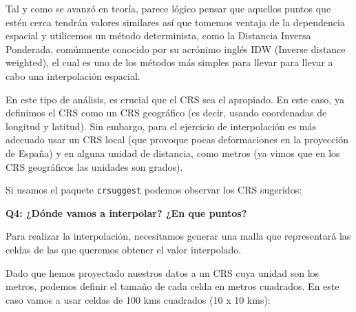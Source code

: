 \documentclass[
]{report}
\newenvironment{Shaded}{\begin{snugshade}}{\end{snugshade}}
\newcommand{\AttributeTok}[1]{\textcolor[rgb]{0.77,0.63,0.00}{#1}}
\newcommand{\CommentTok}[1]{\textcolor[rgb]{0.56,0.35,0.01}{\textit{#1}}}
\newcommand{\DecValTok}[1]{\textcolor[rgb]{0.00,0.00,0.81}{#1}}
\newcommand{\FunctionTok}[1]{\textcolor[rgb]{0.00,0.00,0.00}{#1}}
\newcommand{\NormalTok}[1]{#1}
\newcommand{\OtherTok}[1]{\textcolor[rgb]{0.56,0.35,0.01}{#1}}
\newcommand{\SpecialCharTok}[1]{\textcolor[rgb]{0.00,0.00,0.00}{#1}}
\newcommand{\StringTok}[1]{\textcolor[rgb]{0.31,0.60,0.02}{#1}}
\theoremstyle{definition}
\theoremstyle{definition}
\theoremstyle{definition}
\theoremstyle{definition}
\theoremstyle{remark}
\begin{document}
Tal y como se avanzó en teoría, parece lógico pensar que aquellos puntos que
estén cerca tendrán valores similares así que tomemos ventaja de la dependencia
espacial y utilicemos un método determinista, como la Distancia Inversa
Ponderada, comúnmente conocido por su acrónimo inglés IDW (Inverse distance
weighted), el cual es uno de los métodos más simples para llevar para llevar a
cabo una interpolación espacial.

En este tipo de análisis, es crucial que el CRS sea el apropiado. En este caso,
ya definimos el CRS como un CRS geográfico (es decir, usando coordenadas de
longitud y latitud). Sin embargo, para el ejercicio de interpolación es más
adecuado usar un CRS local (que provoque pocas deformaciones en la proyección de
España) y en alguna unidad de distancia, como metros (ya vimos que en los CRS
geográficos las unidades son grados).

Si usamos el paquete \texttt{crsuggest} podemos observar los CRS sugeridos:

\begin{Shaded}
\end{Shaded}

\textbf{Q4: ¿Dónde vamos a interpolar? ¿En que puntos?}

Para realizar la interpolación, necesitamos generar una malla que representará
las celdas de las que queremos obtener el valor interpolado.

Dado que hemos proyectado nuestros datos a un CRS cuya unidad son los metros,
podemos definir el tamaño de cada celda en metros cuadrados. En este caso vamos
a usar celdas de 100 kms cuadrados (10 x 10 kms):
\end{document}
